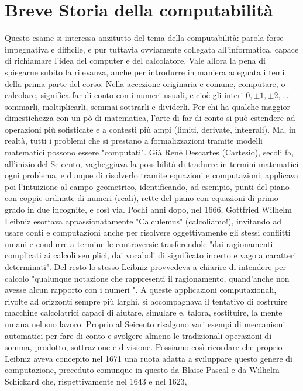 \section{Breve Storia della computabilità}

Questo esame si interessa anzitutto del tema della computabilità: parola forse impegnativa e difficile, e pur tuttavia ovviamente collegata all'informatica, capace di
richiamare l'idea del computer e del calcolatore.
Vale allora la pena di spiegarne subito la rilevanza, anche per introdurre in maniera adeguata i temi della prima parte del corso.
Nella accezione originaria e comune, computare, o calcolare, significa far di conto con i numeri usuali, e cioè gli interi $0, \pm 1, \pm 2, ...$:
sommarli, moltiplicarli, semmai sottrarli e dividerli. Per chi ha qualche maggior dimestichezza con un pò
di matematica, l'arte di far di conto si può estendere ad operazioni più sofisticate e a contesti più ampi (limiti, derivate, integrali). Ma, in realtà, tutti i problemi
che si prestano a formalizzazioni tramite modelli matematici possono essere "computati".
Già René Descartes (Cartesio), secoli fa, all'inizio del Seicento, vagheggiava la possibilità di tradurre in termini matematici ogni problema, e dunque di risolverlo
tramite equazioni e computazioni; applicava poi l'intuizione al campo geometrico, identificando, ad esempio, punti del piano con coppie ordinate
di numeri (reali), rette del piano con equazioni di primo grado in due incognite, e così via.
Pochi anni dopo, nel 1666, Gottfried Wilhelm Leibniz esortava appassionatamente "Calculemus" (calcoliamo!), invitando ad usare conti e computazioni
anche per risolvere oggettivamente gli stessi conflitti umani e condurre a termine le controversie trasferendole "dai ragionamenti complicati ai calcoli semplici, dai
vocaboli di significato incerto e vago a caratteri determinati". Del resto lo stesso Leibniz provvedeva a chiarire di intendere per calcolo
"qualunque notazione che rappresenti il ragionamento, quand'anche non avesse alcun rapporto con i numeri ".
A queste applicazioni computazionali, rivolte ad orizzonti sempre più larghi, si accompagnava il tentativo di costruire macchine calcolatrici capaci di aiutare,
simulare e, talora, sostituire, la mente umana nel suo lavoro. Proprio al Seicento risalgono vari esempi di meccanismi automatici per fare di conto e svolgere almeno
le tradizionali operazioni di somma, prodotto, sottrazione e divisione. Possiamo così ricordare che proprio Leibniz aveva concepito nel 1671 una ruota adatta
a sviluppare questo genere di computazione, preceduto comunque in questo da Blaise Pascal e da Wilhelm Schickard che, rispettivamente nel 1643 e nel 1623,
